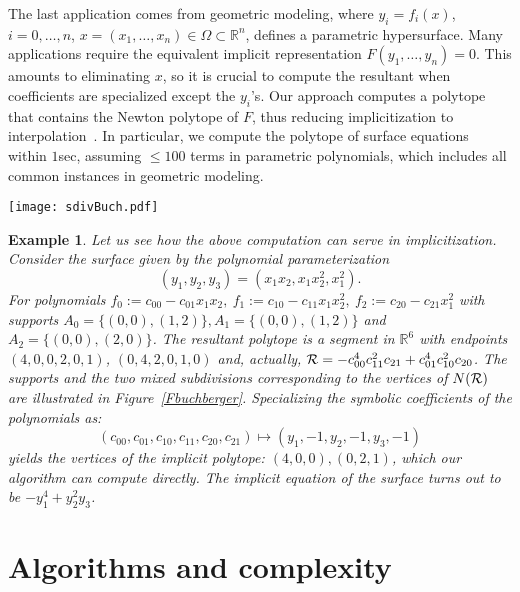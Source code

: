 \documentclass{article}
\newtheorem{example}{Example}
\def\RR{{\mathbb R}} \def\ZZ{{\mathbb Z}}
\begin{document}
The last application comes from geometric modeling, where
$y_i=f_i(x)$, $i=0,\dots,n$, $x=(x_1,\dots,x_n)\in\Omega\subset\RR^n$,
defines a parametric hypersurface. 
Many applications 
require the equivalent implicit representation
$F(y_1,\dots,y_n)=0$.
This amounts to eliminating $x$, so 
it is crucial to compute the resultant 
when coefficients are specialized except the $y_i$'s.
Our approach computes a polytope
that contains the Newton polytope of $F$, thus reducing implicitization
to interpolation~.
In particular, we compute the polytope of surface equations within $1$sec,
assuming $\le 100$ terms in parametric polynomials,
which includes all common instances in geometric modeling.

\begin{figure*}[t]\centering
{}
\qquad \texttt{[image: sdivBuch.pdf]} 
\caption[]{The supports $A_0, A_1, A_2$ of Example~\ref{ExamBuchberger}, their
Newton polytopes (segments) and the two mixed subdivisions of their Minkowski
sum.
\label{Fbuchberger}} 
\end{figure*}

\begin{example} \label{ExamBuchberger} 
Let us see how the above computation can serve in implicitization.
Consider the surface given by the polynomial parameterization 
$$ (y_1,y_2,y_3) = (x_1 x_2, x_1 x_2^2, x_1^2).  $$
For polynomials
$f_0:=c_{00}-c_{01}x_1x_2,~ f_1:=c_{10}-c_{11}x_1x_2^2,~f_2:=c_{20}-c_{21}x_1^2$
with supports
$A_0=\{(0,0), (1,2)\}, A_1=\{(0,0), (1,2)\}$ and $A_2=\{(0,0), (2,0)\}$.
The resultant polytope is a segment in $\RR^6$ with endpoints
$(4,0,0,2,0,1)$,  $(0,4,2,0,1,0)$ and, actually,
${\mathcal R}=-c_{00}^4c_{11}^2c_{21}+c_{01}^4c_{10}^2c_{20}$.
The supports and the two mixed subdivisions corresponding to the vertices of
$N({\mathcal R})$ are illustrated in Figure~\ref{Fbuchberger}.
Specializing the symbolic coefficients of the polynomials as: 
$$ (c_{00}, c_{01}, c_{10}, c_{11}, c_{20}, c_{21})\mapsto (y_1, -1, y_2, -1,
y_3, -1) $$
yields the vertices of the implicit polytope: $(4,0,0), (0,2,1)$,
which our algorithm can compute directly.
The implicit equation of the surface turns out to be $-y_1^4 + y_2^2 y_3$.
\end{example}


\section{Algorithms and complexity}\label{Sproject}
\newcommand{\Li}{{\cal L}}
 \newcommand{\Sub}{{\cal S}}
 \newcommand{\T}{{T}}
 \newcommand{\J}{{\cal J}}
 \newcommand{\illH}{{\cal H}_{illegal}}
 \newcommand{\W}{{\cal W}}
 \newcommand{\Q}{Q^{H}}
 \newcommand{\Qo}{Q_o^{H}}
 \newcommand{\V}{Q}
\end{document}
